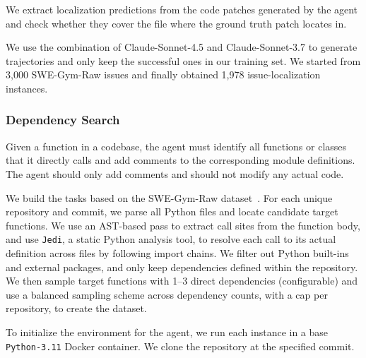 \documentclass{article}
\theoremstyle{plain}
\theoremstyle{definition}
\theoremstyle{remark}
\begin{document}
We extract localization predictions from the code patches generated by the agent and check whether they cover the file where the ground truth patch locates in.

We use the combination of Claude-Sonnet-4.5 and Claude-Sonnet-3.7 to generate trajectories and only keep the successful ones in our training set.
We started from 3,000 SWE-Gym-Raw issues and finally obtained 1,978 issue-localization instances.

\subsubsection{Dependency Search}
Given a function in a codebase, the agent must identify all functions or classes that it directly calls and add comments to the corresponding module definitions. The agent should only add comments and should not modify any actual code.

We build the tasks based on the SWE-Gym-Raw dataset~\citep{swegym}. 
For each unique repository and commit, we parse all Python files and locate candidate target functions.
We use an AST-based pass to extract call sites from the function body, and use \texttt{Jedi}, a static Python
analysis tool, to resolve each call to its actual definition across files by following import chains.
We filter out Python built-ins and external packages, and only keep dependencies defined within the repository.
We then sample target functions with 1--3 direct dependencies (configurable) and use a balanced sampling scheme across dependency counts, with a cap per repository, to create the dataset.

To initialize the environment for the agent, we run each instance in a base \texttt{Python-3.11} Docker container.
We clone the repository at the specified commit.
\end{document}
